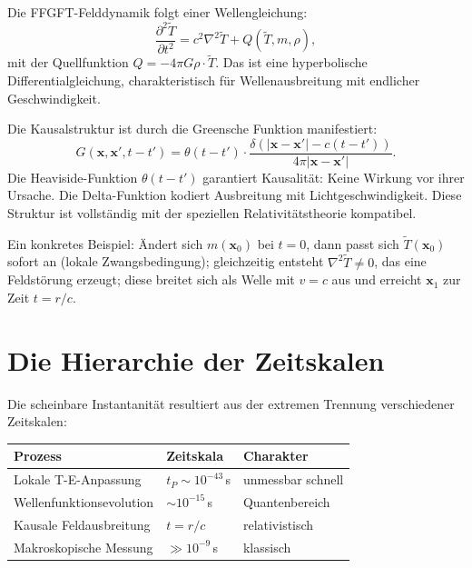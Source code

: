 Die FFGFT-Felddynamik folgt einer Wellengleichung:
\begin{equation}
  \frac{\partial^2\tilde T}{\partial t^2} = c^2\nabla^2\tilde T + Q(\tilde T,m,\rho),
\end{equation}
mit der Quellfunktion $Q = -4\pi G\rho\cdot\tilde T$. Das ist eine
hyperbolische Differentialgleichung, charakteristisch für
Wellenausbreitung mit endlicher Geschwindigkeit.

Die Kausalstruktur ist durch die Greensche Funktion manifestiert:
\begin{equation}
  G(\mathbf{x},\mathbf{x}',t-t') = \theta(t-t')\cdot
  \frac{\delta(|\mathbf{x}-\mathbf{x}'|-c(t-t'))}{4\pi|\mathbf{x}-\mathbf{x}'|}.
\end{equation}
Die Heaviside-Funktion $\theta(t-t')$ garantiert Kausalität: Keine
Wirkung vor ihrer Ursache. Die Delta-Funktion kodiert Ausbreitung mit
Lichtgeschwindigkeit. Diese Struktur ist vollständig mit der speziellen
Relativitätstheorie kompatibel.

Ein konkretes Beispiel: Ändert sich $m(\mathbf{x}_0)$ bei $t = 0$, dann
passt sich $\tilde T(\mathbf{x}_0)$ sofort an (lokale Zwangsbedingung);
gleichzeitig entsteht $\nabla^2\tilde T\ne0$, das eine Feldstörung
erzeugt; diese breitet sich als Welle mit $v = c$ aus und erreicht
$\mathbf{x}_1$ zur Zeit $t = r/c$.

\section{Die Hierarchie der Zeitskalen}

Die scheinbare Instantanität resultiert aus der extremen Trennung
verschiedener Zeitskalen:

\begin{center}
\small\renewcommand{\arraystretch}{1.3}
\begin{tabular}{p{3.5cm}p{2.5cm}p{3.2cm}}
\toprule
\textbf{Prozess} & \textbf{Zeitskala} & \textbf{Charakter} \\
\midrule
Lokale T-E-Anpassung & $t_P\sim10^{-43}$\,s & unmessbar schnell \\
Wellenfunktionsevolution & $\sim10^{-15}$\,s & Quantenbereich \\
Kausale Feldausbreitung & $t = r/c$ & relativistisch \\
Makroskopische Messung & $\gg10^{-9}$\,s & klassisch \\
\bottomrule
\end{tabular}
\end{center}

